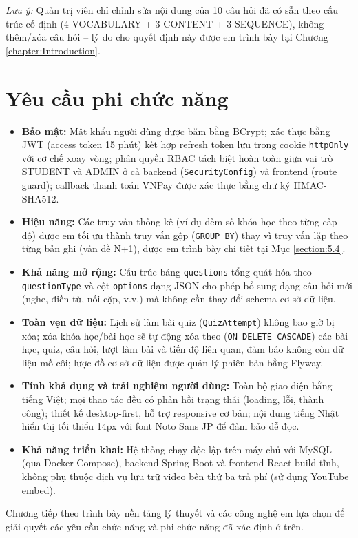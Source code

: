 \documentclass[../DoAn.tex]{subfiles}
\begin{document}
\textit{Lưu ý:} Quản trị viên chỉ chỉnh sửa nội dung của 10 câu hỏi đã có sẵn theo cấu trúc cố định (4 VOCABULARY + 3 CONTENT + 3 SEQUENCE), không thêm/xóa câu hỏi -- lý do cho quyết định này được em trình bày tại Chương \ref{chapter:Introduction}.

\section{Yêu cầu phi chức năng}
\label{section:2.4}

\begin{itemize}
    \item \textbf{Bảo mật:} Mật khẩu người dùng được băm bằng BCrypt; xác thực bằng JWT (access token 15 phút) kết hợp refresh token lưu trong cookie \texttt{httpOnly} với cơ chế xoay vòng; phân quyền RBAC tách biệt hoàn toàn giữa vai trò STUDENT và ADMIN ở cả backend (\texttt{SecurityConfig}) và frontend (route guard); callback thanh toán VNPay được xác thực bằng chữ ký HMAC-SHA512.
    \item \textbf{Hiệu năng:} Các truy vấn thống kê (ví dụ đếm số khóa học theo từng cấp độ) được em tối ưu thành truy vấn gộp (\texttt{GROUP BY}) thay vì truy vấn lặp theo từng bản ghi (vấn đề N+1), được em trình bày chi tiết tại Mục \ref{section:5.4}.
    \item \textbf{Khả năng mở rộng:} Cấu trúc bảng \texttt{questions} tổng quát hóa theo \texttt{questionType} và cột \texttt{options} dạng JSON cho phép bổ sung dạng câu hỏi mới (nghe, điền từ, nối cặp, v.v.) mà không cần thay đổi schema cơ sở dữ liệu.
    \item \textbf{Toàn vẹn dữ liệu:} Lịch sử làm bài quiz (\texttt{QuizAttempt}) không bao giờ bị xóa; xóa khóa học/bài học sẽ tự động xóa theo (\texttt{ON DELETE CASCADE}) các bài học, quiz, câu hỏi, lượt làm bài và tiến độ liên quan, đảm bảo không còn dữ liệu mồ côi; lược đồ cơ sở dữ liệu được quản lý phiên bản bằng Flyway.
    \item \textbf{Tính khả dụng và trải nghiệm người dùng:} Toàn bộ giao diện bằng tiếng Việt; mọi thao tác đều có phản hồi trạng thái (loading, lỗi, thành công); thiết kế desktop-first, hỗ trợ responsive cơ bản; nội dung tiếng Nhật hiển thị tối thiểu 14px với font Noto Sans JP để đảm bảo dễ đọc.
    \item \textbf{Khả năng triển khai:} Hệ thống chạy độc lập trên máy chủ với MySQL (qua Docker Compose), backend Spring Boot và frontend React build tĩnh, không phụ thuộc dịch vụ lưu trữ video bên thứ ba trả phí (sử dụng YouTube embed).
\end{itemize}

Chương tiếp theo trình bày nền tảng lý thuyết và các công nghệ em lựa chọn để giải quyết các yêu cầu chức năng và phi chức năng đã xác định ở trên.
\end{document}
